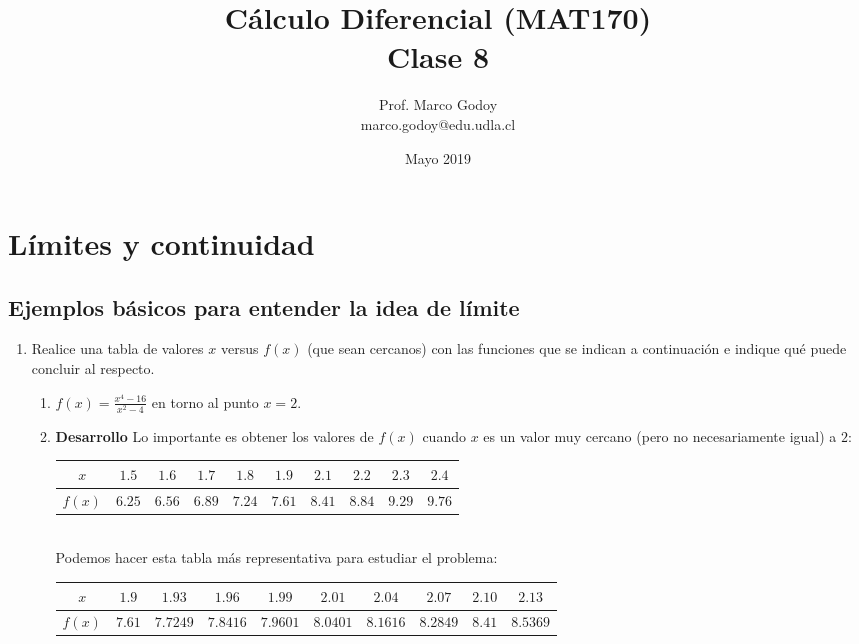 \documentclass[10pt]{article}
\title{C\'alculo Diferencial (MAT170)\\ Clase 8 }
\author{Prof. Marco Godoy\\
marco.godoy@edu.udla.cl}
\date{Mayo 2019}
\newcommand{\2}[1]{\hspace{-0.93cm}\colorbox{color1}{\hspace{0.07cm} \parbox{17cm}{\vspace{0.2cm} #1}\hspace*{0.07cm} }}
\newcommand{\3}[1]{\hspace{-0.93cm}\colorbox{color7}{\hspace{0.07cm} \parbox{17cm}{\vspace{0.2cm} #1}\hspace*{0.07cm} }}
\theoremstyle{theorem}
\numberwithin{equation}{section}
\newcommand{\dis}{\displaystyle}
\begin{document}
\maketitle

\section{L\'imites y continuidad}

\subsection{Ejemplos b\'asicos para entender la idea de l\'imite}

\begin{enumerate}[P1.]
\item Realice una tabla de valores $x$ versus $ f(x)$ (que sean cercanos) con las funciones que se indican a continuaci\'on e indique qu\'e puede concluir al respecto.
  \begin{enumerate}[1.]
     \item $\dis f(x)=\frac{x^4-16}{x^2-4}$ en torno al punto $x=2$.\\
     \item[] \textbf{Desarrollo} Lo importante es obtener los valores de $f(x)$ cuando $x$ es un valor muy cercano (pero no necesariamente igual) a $2$:
     \begin{table}[h!]
   \centering
   \begin{tabular}{|c |c| c| c| c| c| c| c| c| c |} 
   \hline
     $x$   &  $1.5$ & $1.6$&$1.7$&$1.8$&$1.9$&$2.1$&$2.2$ &$2.3$&$2.4$  \\ %
   \hline
   $f(x)$ &   $6.25$ & $6.56$&$6.89$&$7.24$&$7.61$&$8.41$&$8.84$ &$9.29$&$9.76$  \\%
   \hline
   \end{tabular}
   \end{table}
   \\
   Podemos hacer esta tabla m\'as representativa para estudiar el problema:
   \begin{table}[h!]
   \centering
   \begin{tabular}{|c |c| c| c| c| c| c| c| c| c |} 
   \hline
     $x$   &  $1.9$ & $1.93$&$1.96$&$1.99$&$2.01$&$2.04$&$2.07$ &$2.10$&$2.13$  \\ %
   \hline
   $f(x)$ &   $7.61$ & $7.7249$&$7.8416$&$7.9601$& $8.0401$&$8.1616$&$8.2849$ &$8.41$&$8.5369$  \\%

\end{tabular}
\end{table}
\end{enumerate}
\end{enumerate}
\end{document}
